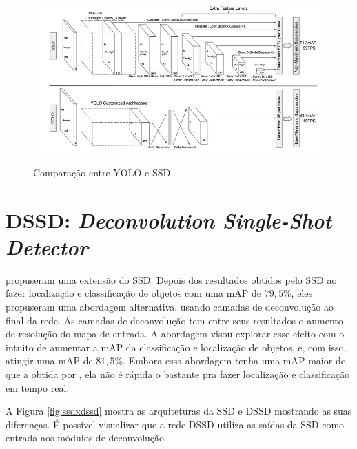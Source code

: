   \begin{figure}[t]
	\setlength{\abovecaptionskip}{0pt}
	\setlength{\belowcaptionskip}{0pt}
	\caption[YOLO e SSD]{Comparação entre \ac{YOLO} e \ac{SSD}}
	\centering
	\includegraphics[width=.6\textwidth]{imagem/0x_yoloxssd.JPG}
	\captionsetup{justification=centering}
	\label{fig:yoloxssd}
\end{figure}

\section{DSSD: \textit{Deconvolution Single-Shot Detector}}
\label{secao:3:3}

 propuseram uma extensão do \ac{SSD}. Depois dos resultados obtidos pelo \ac{SSD} ao fazer localização e classificação de objetos com uma \ac{mAP} de $79,5\%$, eles propuseram uma abordagem alternativa, usando camadas de deconvolução ao final da rede. As camadas de deconvolução tem entre seus resultados o aumento de resolução do mapa de entrada. A abordagem visou explorar esse efeito com o intuito de aumentar a \ac{mAP} da classificação e localização de objetos, e, com isso, atingir uma \ac{mAP} de $81,5\%$. Embora essa abordagem tenha uma \ac{mAP} maior do que a obtida por , ela não é rápida o bastante pra fazer localização e classificação em tempo real.

A Figura \ref{fig:ssdxdssd} mostra as arquiteturas da \ac{SSD} e \ac{DSSD} mostrando as suas diferenças. É possível visualizar que a rede \ac{DSSD} utiliza as saídas da \ac{SSD} como entrada aos módulos de deconvolução.


